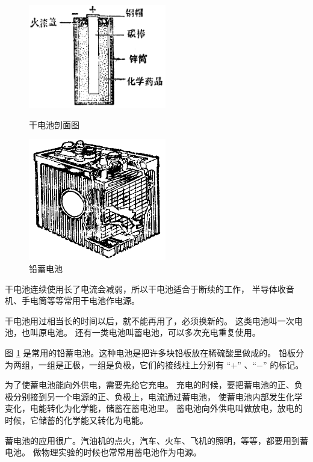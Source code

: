 \begin{figure}[htbp]
    \centering
    \begin{minipage}{7cm}
    \centering
    \includegraphics[width=6cm]{../pic/czwl2-ch7-11}
    \caption{干电池剖面图}\label{fig:7-11}
    \end{minipage}
    \qquad
    \begin{minipage}{7cm}
    \centering
    \includegraphics[width=6cm]{../pic/czwl2-ch7-12}
    \caption{铅蓄电池}\label{fig:7-12}
    \end{minipage}
\end{figure}


干电池连续使用长了电流会减弱，所以干电池适合于断续的工作，
半导体收音机、手电筒等等常用干电池作电源。

干电池用过相当长的时间以后，就不能再用了，必须换新的。
这类电池叫一次电池，也叫原电池。
还有一类电池叫蓄电池，可以多次充电重复使用。

图 \ref{fig:7-12} 是常用的铅蓄电池。这种电池是把许多块铅板放在稀硫酸里做成的。
铅板分为两组，一组是正极，一组是负极，它们的接线柱上分别有 “$+$” 、“$-$” 的标记。

为了使蓄电池能向外供电，需要先给它充电。
充电的时候，要把蓄电池的正、负极分别接到另一个电源的正、负极上，电流通过蓄电池，
使蓄电池内部发生化学变化，电能转化为化学能，储蓄在蓄电池里。
蓄电池向外供电叫做放电，放电的时候，它储蓄的化学能又转化为电能。

蓄电池的应用很广。汽油机的点火，汽车、火车、飞机的照明，等等，都要用到蓄电池。
做物理实验的时候也常常用蓄电池作为电源。

